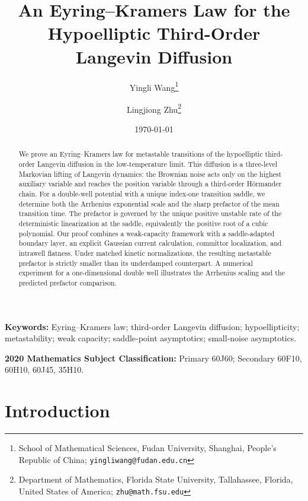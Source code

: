 \documentclass[11pt]{article}
\title{An Eyring--Kramers Law for the Hypoelliptic Third-Order\\
Langevin Diffusion}
\author{
Yingli Wang\thanks{School of Mathematical Sciences, Fudan University, Shanghai, People's Republic of China; \texttt{yingliwang@fudan.edu.cn}}
\and
Lingjiong Zhu\thanks{Department of Mathematics, Florida State University, Tallahassee, Florida, United States of America; \texttt{zhu@math.fsu.edu}}}
\date{\today}
\providecommand{\keywords}[1]{%
  \par\smallskip\noindent\textbf{Keywords: }#1\par}
\providecommand{\subjclass}[2][]{%
  \par\smallskip\noindent\textbf{#1 Mathematics Subject Classification: }#2\par}
\numberwithin{equation}{section}
\theoremstyle{plain}
\theoremstyle{definition}
\theoremstyle{remark}
\begin{document}
\maketitle

\begin{abstract}
We prove an Eyring--Kramers law for metastable transitions of the
hypoelliptic third-order Langevin diffusion in the low-temperature limit.
This diffusion is a three-level Markovian lifting of Langevin dynamics:
the Brownian noise acts only on the highest auxiliary variable and reaches
the position variable through a third-order H\"ormander chain.  For a
double-well potential with a unique index-one transition saddle, we
determine both the Arrhenius exponential scale and the sharp prefactor of
the mean transition time.  The prefactor is governed by the unique positive
unstable rate of the deterministic linearization at the saddle,
equivalently the positive root of a cubic polynomial.  Our proof combines
a weak-capacity framework with a saddle-adapted boundary layer, an explicit
Gaussian current calculation, committor localization, and intrawell
flatness.
Under matched kinetic normalizations, the resulting metastable prefactor is
strictly smaller than its underdamped counterpart.
A numerical experiment for a one-dimensional double well illustrates the
Arrhenius scaling and the predicted prefactor comparison.
\end{abstract}

\keywords{Eyring--Kramers law; third-order Langevin diffusion;
hypoellipticity; metastability; weak capacity;
saddle-point asymptotics; small-noise asymptotics.}

\subjclass[2020]{Primary 60J60;
Secondary 60F10, 60H10, 60J45, 35H10.}

\tableofcontents

\section{Introduction}
\end{document}
